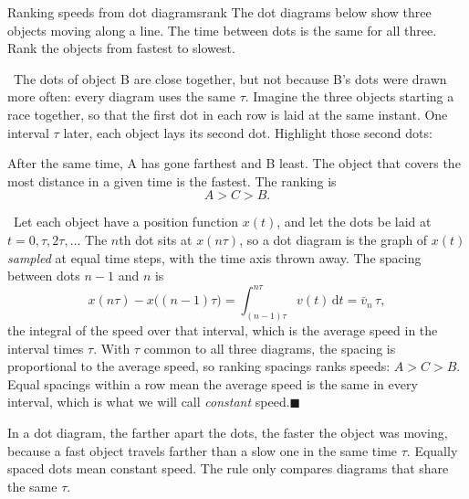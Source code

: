 \documentclass[11pt,twoside,openany]{book}
\newcommand{\dd}{\mathrm{d}}
\newcommand{\viewtag}[3]{\fcolorbox{#2}{#3}{\footnotesize\textbf{\textcolor{#2}{#1}}}}
\newcommand{\elemtag}{\viewtag{Elementary}{elemcol}{elempale}}
\newcommand{\calctag}{\viewtag{Calculus}{calccol}{calcpale}}
\newcommand{\elem}{\par\medskip\noindent\elemtag\ }
\newcommand{\calc}{\par\medskip\noindent\calctag\ }
\newcommand{\qed}{\hfill$\blacksquare$}
\newcommand{\dotrow}[4]{%
  \node[anchor=east] at (-0.3,#4) {#1};
  \foreach \i in {0,...,\numexpr#3-1\relax}{\fill (\i*#2,#4) circle (2.2pt);}}
\begin{document}
\begin{example}{Ranking speeds from dot diagrams}{rank}
The dot diagrams below show three objects moving along a line. The time between dots is the same for all three. Rank the objects from fastest to slowest.
\begin{center}
\end{center}

\elem The dots of object B are close together, but not because B's dots were drawn more often: every diagram uses the same $\tau$. Imagine the three objects starting a race together, so that the first dot in each row is laid at the same instant. One interval $\tau$ later, each object lays its second dot. Highlight those second dots:
\begin{center}
\end{center}
After the same time, A has gone farthest and B least. The object that covers the most distance in a given time is the fastest. The ranking is
\[
A > C > B.
\]

\calc Let each object have a position function $x(t)$, and let the dots be laid at $t = 0, \tau, 2\tau, \ldots$ The $n$th dot sits at $x(n\tau)$, so a dot diagram is the graph of $x(t)$ \emph{sampled} at equal time steps, with the time axis thrown away. The spacing between dots $n-1$ and $n$ is
\[
x(n\tau) - x\big((n-1)\tau\big) = \int_{(n-1)\tau}^{n\tau} v(t)\,\dd t = \bar v_n\,\tau,
\]
the integral of the speed over that interval, which is the average speed in the interval times $\tau$. With $\tau$ common to all three diagrams, the spacing is proportional to the average speed, so ranking spacings ranks speeds: $A > C > B$. Equal spacings within a row mean the average speed is the same in every interval, which is what we will call \emph{constant} speed.\qed
\end{example}

\begin{keyidea}
In a dot diagram, the farther apart the dots, the faster the object was moving, because a fast object travels farther than a slow one in the same time $\tau$. Equally spaced dots mean constant speed. The rule only compares diagrams that share the same $\tau$.
\end{keyidea}
\end{document}
